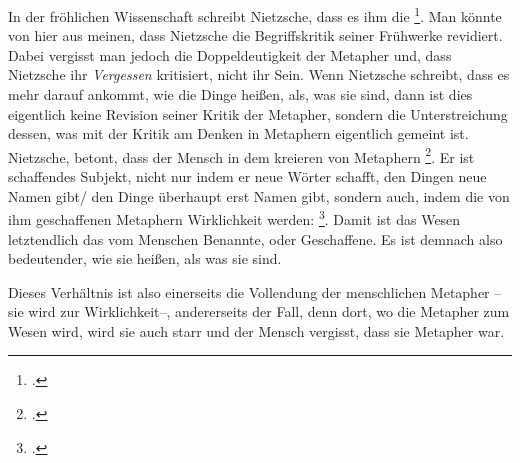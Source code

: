 \documentclass[12pt, a4paper, openany]{report}
\begin{document}
In der fröhlichen Wissenschaft schreibt Nietzsche, dass es ihm die \footcite[][§ 58. S. 422.]{nietzsche_morgenrote_1999}.
Man könnte von hier aus meinen, dass Nietzsche die Begriffskritik seiner Frühwerke revidiert. 
Dabei vergisst man jedoch die Doppeldeutigkeit der Metapher und, dass Nietzsche ihr \emph{Vergessen} kritisiert, nicht ihr Sein. 
Wenn Nietzsche schreibt, dass es mehr darauf ankommt, wie die Dinge heißen, als, was sie sind, dann ist dies eigentlich keine Revision seiner Kritik der Metapher, sondern die Unterstreichung dessen, was mit der Kritik am Denken in Metaphern eigentlich gemeint ist.
Nietzsche, betont, dass der Mensch in dem kreieren von Metaphern \footcite[][883]{nietzsche_geburt_1999}.
Er ist schaffendes Subjekt, nicht nur indem er neue Wörter schafft, den Dingen neue Namen gibt/ den Dinge überhaupt erst Namen gibt, sondern auch, indem die von ihm geschaffenen Metaphern Wirklichkeit werden: 
\footcite[][§ 58, S. 422]{nietzsche_morgenrote_1999}.
Damit ist das Wesen letztendlich das vom Menschen Benannte, oder Geschaffene.
Es ist demnach also bedeutender, wie sie heißen, als was sie sind.
\begin{comment}
Nietzsche betont, dass die Macht des Menschen/ des Denkens in dem Schaffen von Dingen besteht, denn wir oben erwähnt ist das Verwenden von Metaphern eng verwandt mit dem Schaffen neuer Dinge.
Indem wir die Rosen nun auch Liebe ist, oder: einen neuen Namen hat, \emph{ist} sie auch tatsächlich was anderes.. 
Nietzsche drückt dies aus mit der Macht, oder dem Recht \qq{Namen zu geben}\footcite[][S. 260. Wir sehen hier, dass sich dieser Gedanke, von seinen Frühwerken, bis zur seiner düsteren Phase durchzieht.]{nietzsche_jenseits_2014}, oder darin, dass \qq{es genügt, neue Namen [...] zu schaffen, um auf die Länge hin neue >>Dinge<< zu schaffen}\footcite[][417]{nietzsche_morgenrote_1999}. 
Die Macht der Metapher, mehr zu schaffen, wird hier affirmiert:
der Schein wird \qq{zum Wesen und \so{wirkt} als Wesen}\footcite[][422]{nietzsche_morgenrote_1999}.
\end{comment}
Dieses Verhältnis ist also einerseits die Vollendung der menschlichen Metapher -- sie wird zur Wirklichkeit--, andererseits der Fall, denn dort, wo die Metapher zum Wesen wird, wird sie auch starr und der Mensch vergisst, dass sie Metapher war. 
\end{document}
